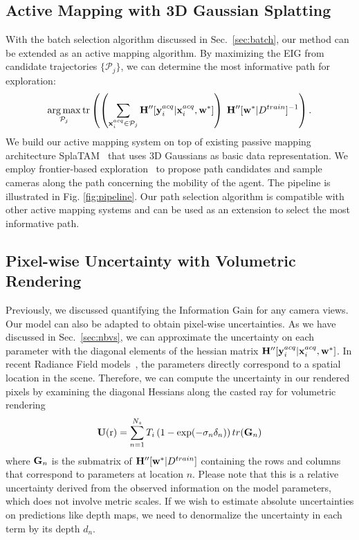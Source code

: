 \subsection{Active Mapping with 3D Gaussian Splatting}
\label{sec:mapping}

With the batch selection algorithm discussed in Sec.~\ref{sec:batch}, our method can be extended as an active mapping algorithm. By maximizing the EIG from candidate trajectories $\{\mathcal{P}_j\}$, we can determine the most informative path for exploration: 
\begin{equation}\label{eq:path}
    \operatorname*{arg\,max}_{\mathcal{P}_j} \operatorname{tr}\left( \left( \sum_{{\bf x}^{acq}_i \in \mathcal{P}_j} {\mathbf H}''[{\bf y}^{acq}_i | {\bf x}^{acq}_i, {\bf w}^*]\right) \; {\mathbf H}''[{\bf w}^*| D^{train}]^{-1}\right).
\end{equation}
We build our active mapping system on top of existing passive mapping architecture SplaTAM~\cite{keetha2023splatam} that uses 3D Gaussians as basic data representation.
We employ frontier-based exploration~\cite{yamauchi1997frontier} to propose path candidates and sample cameras along the path concerning the mobility of the agent. 
The pipeline is illustrated in Fig. \ref{fig:pipeline}.
Our path selection algorithm is compatible with other active mapping systems and can be used as an extension to select the most informative path. 
\subsection{Pixel-wise Uncertainty with Volumetric Rendering}\label{sec:pixel-uncern}
Previously, we discussed quantifying the Information Gain for any camera views. Our model can also be adapted to obtain pixel-wise uncertainties.
As we have discussed in Sec.~\ref{sec:nbvs}, we can approximate the uncertainty on each parameter with the diagonal elements of the hessian matrix ${\mathbf H}''[{\bf y}^{acq}_i | {\bf x}^{acq}_i, {\bf w}^*]$. In recent Radiance Field models~\cite{kerbl3Dgaussians, plenoxels}, the parameters directly correspond to a spatial location in the scene.
Therefore, we can compute the uncertainty in our rendered pixels by examining the diagonal Hessians along the casted ray for volumetric rendering
\begin{equation}
\label{eq:render-uncern}
\mathbf{U}(\text{r}) = \sum_{n=1}^{N_s} T_i \left(1-\exp(-\sigma_n \delta_n) \right) tr({\bf G}_n)
\end{equation}
where ${\bf G}_n$ is the submatrix of ${\mathbf H}''[{\bf w}^*| D^{train}]$ containing the rows and columns that correspond to parameters at location $n$.
Please note that this is a relative uncertainty derived from the observed information on the model parameters, which does not involve metric scales. If we wish to estimate absolute uncertainties on predictions like depth maps, we need to denormalize the uncertainty in each term by its depth $d_n$.

